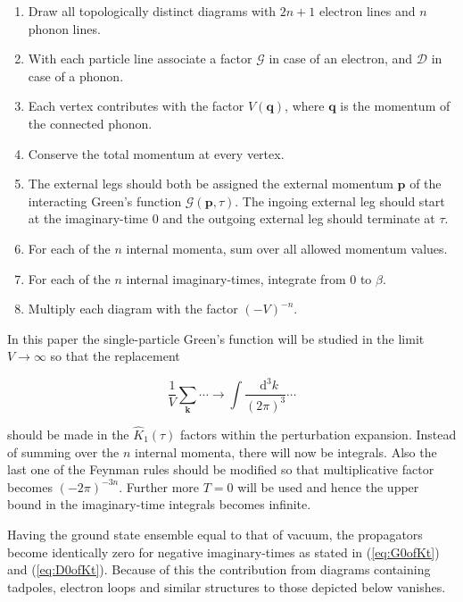 \documentclass[12pt]{report}
\renewcommand{\vec}[1]{\boldsymbol{\mathbf{#1}}}                        %
\newcommand*\diff{\mathop{}\!\mathrm{d}}
\newcommand{\Gt}{\mathcal{G}}
\newcommand{\Dt}{\mathcal{D}}
\begin{document}
\begin{enumerate}
	\item Draw all topologically distinct diagrams with $ 2n + 1 $ electron lines and $ n $ phonon lines.
	\item With each particle line associate a factor $ \Gt $ in case of an electron, and $ \Dt $ in case of a phonon.
	\item Each vertex contributes with the factor $ V(\vec q) $, where $ \vec q $ is the momentum of the connected phonon.
	\item Conserve the total momentum at every vertex.
	\item The external legs should both be assigned the external momentum $ \vec p $ of the interacting Green's function $ \Gt(\vec p, \tau) $. The ingoing external leg should start at the imaginary-time $ 0 $ and the outgoing external leg should terminate at $ \tau $.
	\item For each of the $ n $ internal momenta, sum over all allowed momentum values.
	\item For each of the $ n $ internal imaginary-times, integrate from $ 0 $ to $ \beta $.
	\item Multiply each diagram with the factor $ (-V)^{-n} $.
\end{enumerate}

In this paper the single-particle Green's function will be studied in the limit $ V \rightarrow \infty $ so that the replacement

\begin{equation}
	\frac{1}{V} \sum_{\vec k} \cdots \rightarrow \int \frac{\diff^3k}{(2\pi)^3} \cdots
\end{equation}

should be made in the $ \hat K_1(\tau) $ factors within the perturbation expansion. Instead of summing over the $ n $ internal momenta, there will now be integrals. Also the last one of the Feynman rules should be modified so that multiplicative factor becomes $ (-2\pi)^{-3n} $. Further more $ T = 0 $ will be used and hence the upper bound in the imaginary-time integrals becomes infinite.

Having the ground state ensemble equal to that of vacuum, the propagators become identically zero for negative imaginary-times as stated in (\ref{eq:G0ofKt}) and (\ref{eq:D0ofKt}). Because of this the contribution from diagrams containing tadpoles, electron loops and similar structures to those depicted below vanishes.
\end{document}
